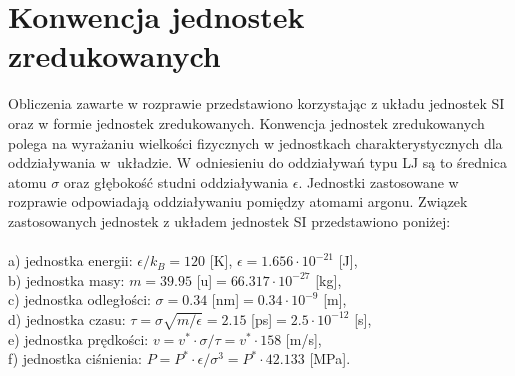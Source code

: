 \documentclass[12pt,a4paper,openright]{report} %
\begin{document}
\section{Konwencja jednostek zredukowanych}
\label{redunit}
%
Obliczenia zawarte w rozprawie przedstawiono korzystając z układu jednostek SI oraz w formie jednostek zredukowanych. Konwencja jednostek zredukowanych polega na wyrażaniu wielkości fizycznych w jednostkach charakterystycznych dla oddziaływania w~układzie. W odniesieniu do oddziaływań typu LJ są to średnica atomu $\sigma$ oraz głębokość studni oddziaływania $\epsilon$. Jednostki zastosowane w rozprawie odpowiadają oddziaływaniu pomiędzy atomami argonu. Związek zastosowanych jednostek z układem jednostek SI przedstawiono poniżej: \\
\\
{a) jednostka energii:} $\epsilon/k_B = 120$ [K], $\epsilon = 1.656 \cdot 10^{-21}$ [J],\\
{b) jednostka masy:} $m=39.95$ [u]$=66.317 \cdot 10^{-27}$ [kg], \\
{c) jednostka odległości:} $\sigma=0.34$ [nm]$ = 0.34 \cdot 10^{-9}$ [m],\\
{d) jednostka czasu:} $\tau = \sigma \sqrt{m/\epsilon} = 2.15$ [ps]$ = 2.5 \cdot 10^{-12}$ [s], \\
{e) jednostka prędkości:} $v=v^{*} \cdot {\sigma / \tau} = v^{*} \cdot 158$ [m/s], \\
{f) jednostka ciśnienia:} $P=P^{*} \cdot \epsilon / \sigma^{3} = P^{*} \cdot 42.133$ [MPa].
%
\end{document}
